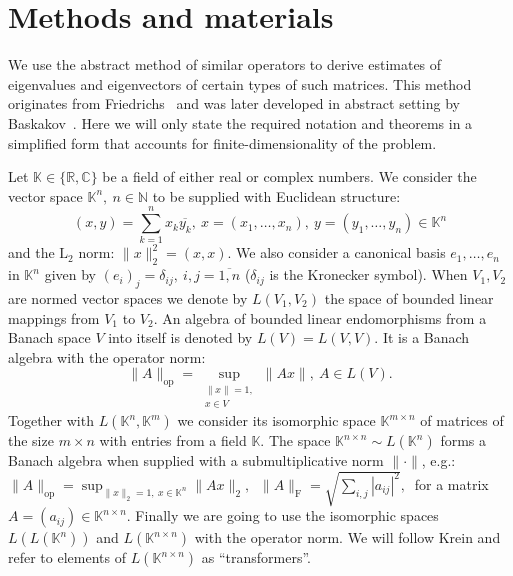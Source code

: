 \documentclass[a4paper]{jpconf}
\begin{document}
\section{Methods and materials}

We use the abstract method of similar operators
    to derive estimates of eigenvalues and eigenvectors
    of certain types of such matrices.
This method originates from Friedrichs~\cite{friedrichs1965advanced}
    and was later developed in abstract setting
    by Baskakov~\cite{baskakov1983methods,baskakov2014memory,baskakov2017method,baskakov2013completeness}.
Here we will only state the required notation and theorems
    in a simplified form that accounts for finite-dimensionality
    of the problem.

Let \( \mathbb{K}\in \{ \mathbb{R}, \mathbb{C} \} \)
    be a field of either real or complex numbers.
We consider the vector space \( \mathbb{K}^n,\ n\in \mathbb{N} \)
    to be supplied with Euclidean structure:
    \[
        (x, y){=}\sum_{k=1}^n x_k\overline{y_k},
        \ x{=}(x_1,\ldots, x_n),
        \ y=(y_1,\ldots, y_n)
        \in \mathbb{K}^n
        \]
    and the \( \mathrm{L}_2 \) norm:
    \(
        \|x\|_2^2{=}(x,x).
        \)
We also consider a canonical basis \( e_1, \ldots, e_n \)
    in \( \mathbb{K}^n \) given by
    \( {(e_i)}_j = \delta_{ij},\ i,j=\overline{1,n} \)
    (\(\delta_{ij} \) is the Kronecker symbol).
When \( V_1, V_2 \) are normed vector spaces
    we denote by \( L(V_1, V_2) \)
    the space of bounded linear mappings
    from \( V_1 \) to \( V_2 \).
An algebra of bounded linear endomorphisms
    from a Banach space \( V \)
    into itself
    is denoted by \( L(V) = L(V, V) \).
It is a Banach algebra with the operator norm:
    \[
        \|A\|_{\mathrm{op}} =
        \sup_{\substack{\|x\|=1,\\ x\in V}} \|A x\|,\ A\in L(V).
        \]
Together with \( L(\mathbb{K}^n, \mathbb{K}^m) \)
    we consider its isomorphic space \( \mathbb{K}^{m{\times}n} \)
    of matrices of the size \( m{\times}n \)
    with entries from a field \( \mathbb{K} \).
The space \( \mathbb{K}^{n{\times}n}\sim L(\mathbb{K}^n) \)
    forms a Banach algebra
    when supplied with a submultiplicative norm
    \( \|\cdot\| \),
    e.g.: \( \|A\|_{\mathrm{op}} = \sup_{\|x\|_2=1,\ x\in \mathbb{K}^n} \|A x\|_2,\ \)
    \( \|A\|_{\mathrm{F}} = \sqrt{\sum_{i,j} |a_{ij}|^2},\ \)
    for a matrix 
    \( A{=}(a_{ij})\in\mathbb{K}^{n\times n} \).
Finally we are going to use the isomorphic spaces
    \( L(L(\mathbb{K}^n)) \) and \( L(\mathbb{K}^{n{\times}n}) \)
    with the operator norm.
We will follow {Krein }
    and refer to elements of \( L(\mathbb{K}^{n{\times}n}) \)
    as ``transformers''.
\end{document}
